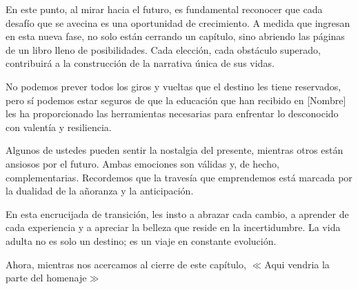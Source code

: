 \documentclass[letterpaper, 12pt]{article}
\renewcommand{\comment}[1]{{\small $\ll$#1$\gg$}}
\begin{document}
En este punto, al mirar hacia el futuro, es fundamental
reconocer que cada desafío que se avecina es una
oportunidad de crecimiento. A medida que ingresan en esta
nueva fase, no solo están cerrando un capítulo, sino
abriendo las páginas de un libro lleno de posibilidades.
Cada elección, cada obstáculo superado, contribuirá a la
construcción de la narrativa única de sus vidas.

No podemos prever todos los giros y vueltas que el destino
les tiene reservados, pero sí podemos estar seguros de que
la educación que han recibido en [Nombre] les ha
proporcionado las herramientas necesarias para enfrentar lo
desconocido con valentía y resiliencia.

Algunos de ustedes pueden sentir la nostalgia del presente,
mientras otros están ansiosos por el futuro. Ambas
emociones son válidas y, de hecho, complementarias.
Recordemos que la travesía que emprendemos está marcada por
la dualidad de la añoranza y la anticipación.

En esta encrucijada de transición, les insto a abrazar cada
cambio, a aprender de cada experiencia y a apreciar la
belleza que reside en la incertidumbre. La vida adulta no
es solo un destino; es un viaje en constante evolución.

Ahora, mientras nos acercamos al cierre de este capítulo,
\comment{Aqui vendria la parte del homenaje}
\end{document}
